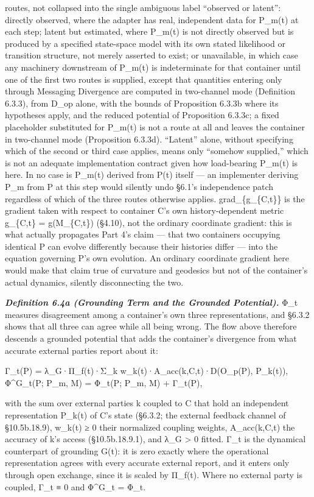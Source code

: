 \documentclass[
]{article}
\begin{document}
routes, not collapsed into the single ambiguous label ``observed or
latent'': directly observed, where the adapter has real, independent
data for P\_m(t) at each step; latent but estimated, where P\_m(t) is
not directly observed but is produced by a specified state-space model
with its own stated likelihood or transition structure, not merely
asserted to exist; or unavailable, in which case any machinery
downstream of P\_m(t) is indeterminate for that container until one of
the first two routes is supplied, except that quantities entering only
through Messaging Divergence are computed in two-channel mode
(Definition 6.3.3), from D\_op alone, with the bounds of Proposition
6.3.3b where its hypotheses apply, and the reduced potential of
Proposition 6.3.3c; a fixed placeholder substituted for P\_m(t) is not a
route at all and leaves the container in two-channel mode (Proposition
6.3.3d). ``Latent'' alone, without specifying which of the second or
third case applies, means only ``somehow supplied,'' which is not an
adequate implementation contract given how load-bearing P\_m(t) is here.
In no case is P\_m(t) derived from P(t) itself --- an implementer
deriving P\_m from P at this step would silently undo §6.1's
independence patch regardless of which of the three routes otherwise
applies. grad\_\{g\_\{C,t\}\} is the gradient taken with respect to
container C's own history-dependent metric g\_\{C,t\} = g(M\_\{C,t\})
(§4.10), not the ordinary coordinate gradient: this is what actually
propagates Part 4's claim --- that two containers occupying identical P
can evolve differently because their histories differ --- into the
equation governing P's own evolution. An ordinary coordinate gradient
here would make that claim true of curvature and geodesics but not of
the container's actual dynamics, silently disconnecting the two.

\emph{\textbf{Definition 6.4a (Grounding Term and the Grounded
Potential).}} Φ\_t measures disagreement among a container's own three
representations, and §6.3.2 shows that all three can agree while all
being wrong. The flow above therefore descends a grounded potential that
adds the container's divergence from what accurate external parties
report about it:

Γ\_t(P) = λ\_G·Π\_f(t)·Σ\_k w\_k(t)·A\_acc(k,C,t)·D(O\_p(P), P\_k(t)),
Φ\^{}G\_t(P; P\_m, M) = Φ\_t(P; P\_m, M) + Γ\_t(P),

with the sum over external parties k coupled to C that hold an
independent representation P\_k(t) of C's state (§6.3.2; the external
feedback channel of §10.5b.18.9), w\_k(t) ≥ 0 their normalized coupling
weights, A\_acc(k,C,t) the accuracy of k's access (§10.5b.18.9.1), and
λ\_G \textgreater{} 0 fitted. Γ\_t is the dynamical counterpart of
grounding G(t): it is zero exactly where the operational representation
agrees with every accurate external report, and it enters only through
open exchange, since it is scaled by Π\_f(t). Where no external party is
coupled, Γ\_t ≡ 0 and Φ\^{}G\_t = Φ\_t.
\end{document}
